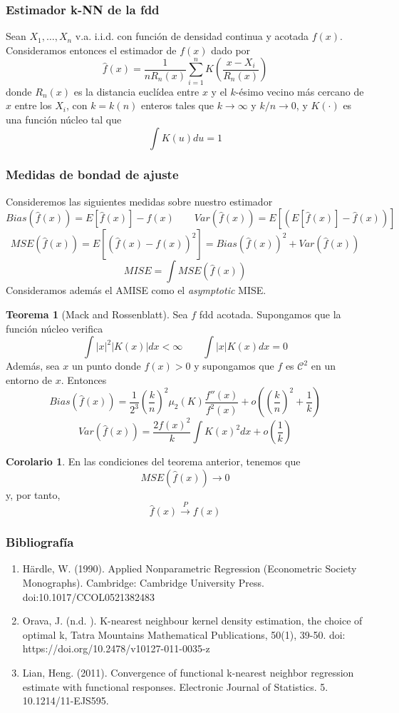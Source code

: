 \documentclass{beamer}
\theoremstyle{definition}
\newtheorem{teorema}{Teorema}
\newtheorem{coro}{Corolario}
\begin{document}
\begin{frame}
\frametitle{Estimador k-NN de la fdd}
Sean $X_1,\dotsc,X_n$ v.a. i.i.d. con función de densidad continua y acotada $f(x)$. Consideramos entonces el estimador de $f(x)$ dado por
$$
\hat{f}(x) = \frac{1}{nR_n(x)}\sum_{i=1}^n K\left(\frac{x-X_i}{R_n(x)}\right)
$$
donde $R_n(x)$ es la distancia euclídea entre $x$ y el $k$-ésimo vecino más cercano de $x$ entre los $X_i$, con $k=k(n)$  enteros tales que $k\to\infty$ y $k/n\to 0$, y $K(\cdot)$ es una función núcleo tal que 
$$
\int K(u)du=1
$$
\end{frame}


\begin{frame}
\frametitle{Medidas de bondad de ajuste}
Consideremos las siguientes medidas sobre nuestro estimador
$$
Bias(\hat{f}(x)) = E[\hat{f}(x)]-f(x) \qquad Var(\hat{f}(x)) = E\left[\left(E[\hat{f}(x)]-\hat{f}(x)\right)\right]
$$
$$
MSE(\hat{f}(x)) = E\left[(\hat{f}(x)-f(x))^2\right] = Bias(\hat{f}(x))^2 + Var(\hat{f}(x))
$$
$$
MISE = \int MSE(\hat{f}(x)) 
$$
Consideramos además el AMISE como el \textit{asymptotic} MISE.
\end{frame}


\begin{frame}
\begin{teorema}[Mack and Rossenblatt] Sea $f$ fdd acotada. Supongamos que la función núcleo verifica
$$
\int |x|^2 |K(x)|dx < \infty \qquad \int |x|K(x) dx = 0
$$
Además, sea $x$ un punto donde $f(x)>0$ y supongamos que $f$ es $\mathcal{C}^2$ en un entorno de $x$. Entonces
$$
Bias(\hat{f}(x)) = \frac{1}{2^3}\left(\frac{k}{n}\right)^2\mu_2(K)\frac{f''(x)}{f^2(x)}+o\left(\left(\frac{k}{n}\right)^2+\frac{1}{k}\right)
$$
$$
Var(\hat{f}(x)) = \frac{2f(x)^2}{k}\int K(x)^2 dx+o\left(\frac{1}{k}\right)
$$
\end{teorema}
\end{frame}



\begin{frame}
\begin{coro}
En las condiciones del teorema anterior, tenemos que
$$
MSE(\hat{f}(x))\to 0
$$
y, por tanto,
$$
\hat{f}(x)\overset{P}{\longrightarrow}f(x)
$$
\end{coro}
\end{frame}
\begin{frame}
\frametitle{Bibliografía}
\begin{enumerate}
\item Härdle, W. (1990). Applied Nonparametric Regression (Econometric Society Monographs). Cambridge: Cambridge University Press. doi:10.1017/CCOL0521382483
\item Orava, J. (n.d. ). K-nearest neighbour kernel density estimation, the choice of optimal k, Tatra Mountains Mathematical Publications, 50(1), 39-50. doi: https://doi.org/10.2478/v10127-011-0035-z
\item Lian, Heng. (2011). Convergence of functional k-nearest neighbor regression estimate with functional responses. Electronic Journal of Statistics. 5. 10.1214/11-EJS595. 
\end{enumerate}

\end{frame}
\end{document}
